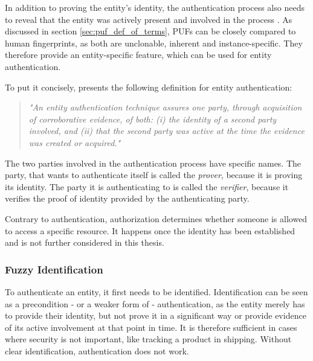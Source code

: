 In addition to proving the entity's identity, the authentication process also needs to reveal that the entity
was actively present and involved in the process \cite[][p. 117f]{Maes2013}.
As discussed in section \ref{sec:puf_def_of_terms}, PUFs can be closely compared to human fingerprints, as both are unclonable,
inherent and instance-specific. They therefore provide an entity-specific feature, which can be used for entity authentication.

To put it concisely, \citeauthor*{Maes2013} presents the following definition for entity authentication:

\begin{quote}
    \emph{"An entity authentication technique assures one party, through acquisition of
        corroborative evidence, of both: (i) the identity of a second party involved,
        and (ii) that the second party was active at the time the evidence was created or
        acquired."} \cite[][p. 117]{Maes2013}
\end{quote}

The two parties involved in the authentication process have specific names. The party, that wants to authenticate
itself is called the \emph{prover}, because it is proving its identity. The party it is authenticating to is
called the \emph{verifier}, because it verifies the proof of identity provided by the authenticating party. \cite[][p. 129]{Maes2013}

Contrary to authentication, authorization determines whether someone is allowed to access
a specific resource. It happens once the identity has been established and is not further considered in this thesis.

\subsubsection{Fuzzy Identification}
\label{sec:fuzzy_identification}

To authenticate an entity, it first needs to be identified.
Identification can be seen as a precondition - or a weaker form of - authentication, as the
entity merely has to provide their identity, but not prove it in a significant way or provide
evidence of its active involvement at that point in time. It is therefore sufficient in cases
where security is not important, like tracking a product in shipping.
Without clear identification, authentication does not work. \cite[][p. 118]{Maes2013}


